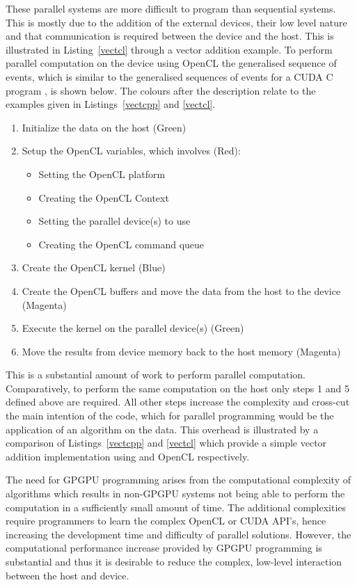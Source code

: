 \documentclass{sig-alternate-05-2015}
\begin{document}
These parallel systems are more difficult to program than sequential 
systems. This is mostly due to the addition of the external devices, 
their low level nature and that communication is required between the device and the
host. This is illustrated in Listing~\ref{vectcl} through a vector addition
example. To perform parallel computation on the device using OpenCL 
the generalised sequence of events, which is similar to the generalised sequences 
of events for a CUDA C program \cite{harris:cuda}, is shown below. The colours after the 
description relate to the examples given in Listings~\ref{vectcpp} and
\ref{vectcl}.
\begin{enumerate}
	\item{Initialize the data on the host (Green)}
	\item{Setup the OpenCL variables, which involves (Red):
			\begin{itemize}
				\item{Setting the OpenCL platform }
				\item{Creating the OpenCL Context }
				\item{Setting the parallel device(s) to use }
				\item{Creating the OpenCL command queue }
		\end{itemize} }
	\item{Create the OpenCL kernel (Blue)}
	\item{Create the OpenCL buffers and move the data from the host to the 
		device (Magenta)}
	\item{Execute the kernel on the parallel device(s) (Green)}
	\item{Move the results from device memory back to the host
		memory (Magenta)}
\end{enumerate}

This is a substantial amount of work to perform parallel computation.
Comparatively, to perform the same computation on the host only 
steps 1 and 5 defined above are required. All other steps increase
the complexity and cross-cut the main intention of
the \CPP code, which for parallel programming would be the application of 
an algorithm on the data. This overhead is 
illustrated by a comparison of Listings~\ref{vectcpp} and \ref{vectcl} which 
provide a simple vector addition implementation using \CPP and OpenCL respectively.

The need for GPGPU programming arises from the computational complexity of
algorithms which results in non-GPGPU systems not being able to perform the
computation in a sufficiently small amount of time. The additional complexities
require programmers to learn the complex OpenCL or CUDA API's, hence increasing
the development time and difficulty of parallel solutions. However, the computational
performance increase
provided by GPGPU programming is substantial and thus it is desirable to reduce the complex, low-level
interaction between the host and device.
\end{document}

